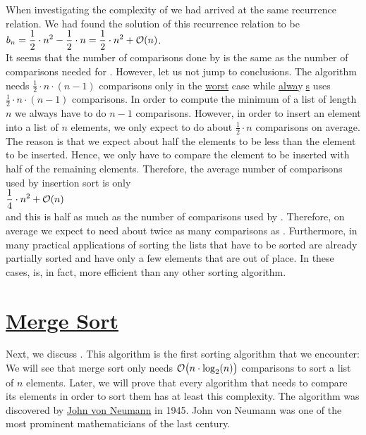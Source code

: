 When investigating the complexity of  we had arrived at the same recurrence
relation. We had found the solution of this recurrence relation to be
\\[0.2cm]
\hspace*{1.3cm} $\displaystyle b_n = \frac{1}{2} \cdot n^2 - \frac{1}{2}\cdot n = \frac{1}{2} \cdot n^2 +
\mathcal{O}(n)$. 
\\[0.2cm]
It seems that the number of comparisons done by  is the same as the number of
comparisons needed for .  However, let us not jump to conclusions.
The algorithm  needs
$\frac{1}{2}\cdot n \cdot (n-1)$ comparisons only in the \underline{worst} case while 
\underline{alwa}y$\!\!$\underline{$\;$s} uses $\frac{1}{2} \cdot n\cdot(n-1)$ comparisons.
In order to compute the minimum of a list of length $n$ we always have to do $n-1$ comparisons.
However, in order to insert an element into a list of $n$ elements, we only expect to do about
$\frac{1}{2} \cdot n$ comparisons on average.  The reason is that we expect about half the elements  to
be less than the element to be inserted.  Hence, we only have to compare the element to be inserted
with half of the remaining elements.  Therefore, the average number of comparisons used by
insertion sort is only
\\[0.2cm]
\hspace*{1.3cm}
 $\displaystyle \frac{1}{4} \cdot n^2 + \mathcal{O}(n)$
\\[0.2cm]
and this is half as much as the number of comparisons used by .  Therefore, on
average we expect  to need about twice as many comparisons as .
Furthermore,  in many practical applications of sorting the lists that have to be sorted are already
partially sorted and have only a few elements that are out of place.  In these cases,
 is, in fact,  more efficient than any other sorting algorithm.


\section{\href{http://en.wikipedia.org/wiki/Merge_sort}{Merge Sort}}
Next, we discuss .  This algorithm
is the first  sorting algorithm that we encounter: We will see that merge sort 
only needs $\mathcal{O}\bigl(n \cdot \log_2(n)\bigr)$ comparisons to sort a list of $n$ elements.  Later, we will prove
that every algorithm that needs to compare its elements in order to sort them has at least this complexity.  
The  algorithm was discovered by
\href{http://en.wikipedia.org/wiki/John_von_Neumann}{John von Neumann} in 1945.  John von Neumann 
was one of the most prominent mathematicians of the last century.  

